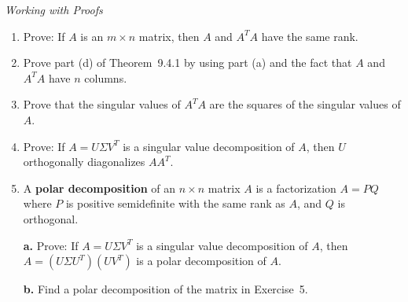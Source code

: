 \documentclass{article}
\begin{document}
\noindent\textit{Working with Proofs}

\begin{enumerate}
  \item[13.] Prove: If $A$ is an $m\times n$ matrix, then $A$ and $A^TA$ have the same
        rank.

  \item[14.] Prove part (d) of Theorem~9.4.1 by using part (a) and the fact that $A$
        and $A^TA$ have $n$ columns.

  \item[17.] Prove that the singular values of $A^TA$ are the squares of the singular
        values of $A$.

  \item[18.] Prove: If $A = U\Sigma V^T$ is a singular value decomposition of $A$, then
        $U$ orthogonally diagonalizes $AA^T$.

  \item[19.] A \textbf{polar decomposition} of an $n\times n$ matrix $A$ is a
        factorization $A = PQ$ where $P$ is positive semidefinite with the same rank
        as $A$, and $Q$ is orthogonal.

        \textbf{a.} Prove: If $A = U\Sigma V^T$ is a singular value decomposition of $A$,
        then $A = (U\Sigma U^T)(UV^T)$ is a polar decomposition of $A$.

        \textbf{b.} Find a polar decomposition of the matrix in Exercise~5.

\end{enumerate}
\end{document}
